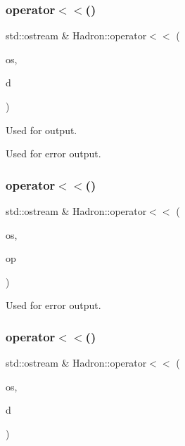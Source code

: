 \mbox{\label{namespaceHadron_accc8a0a89713671c3a48ac45536eac45}} 
\subsubsection{\texorpdfstring{operator$<$$<$()}{operator<<()}\hspace{0.1cm}{\footnotesize\ttfamily [38/48]}}
{\footnotesize\ttfamily std\+::ostream \& Hadron\+::operator$<$$<$ (\begin{DoxyParamCaption}\item[{std\+::ostream \&}]{os,  }\item[{const \mbox{\hyperlink{structHadron_1_1KeyHadronNode__t}{Key\+Hadron\+Node\+\_\+t}} \&}]{d }\end{DoxyParamCaption})}



Used for output. 

Used for error output. \mbox{\label{namespaceHadron_a16e2cbe171cccf191439c38f7ce36655}} 
\subsubsection{\texorpdfstring{operator$<$$<$()}{operator<<()}\hspace{0.1cm}{\footnotesize\ttfamily [39/48]}}
{\footnotesize\ttfamily std\+::ostream \& Hadron\+::operator$<$$<$ (\begin{DoxyParamCaption}\item[{std\+::ostream \&}]{os,  }\item[{const \mbox{\hyperlink{structHadron_1_1HadronQuarkLocation__t}{Hadron\+Quark\+Location\+\_\+t}} \&}]{op }\end{DoxyParamCaption})}



Used for error output. 

\mbox{\label{namespaceHadron_a243db37c66ec71b086f54a64d62fa659}} 
\subsubsection{\texorpdfstring{operator$<$$<$()}{operator<<()}\hspace{0.1cm}{\footnotesize\ttfamily [40/48]}}
{\footnotesize\ttfamily std\+::ostream \& Hadron\+::operator$<$$<$ (\begin{DoxyParamCaption}\item[{std\+::ostream \&}]{os,  }\item[{const \mbox{\hyperlink{classADAT_1_1Array1dO}{Array1dO}}$<$ \mbox{\hyperlink{structHadron_1_1KeyHadronNode__t}{Key\+Hadron\+Node\+\_\+t}} $>$ \&}]{d }\end{DoxyParamCaption})}



